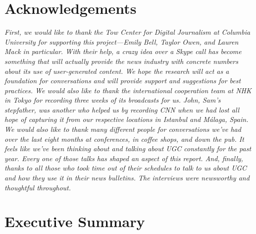 \chapter{Acknowledgements}
\textit{First, we would like to thank the Tow Center for Digital Journalism at Columbia University for supporting this project—Emily Bell, Taylor Owen, and Lauren Mack in particular. With their help, a crazy idea over a Skype call has become something that will actually provide the news industry with concrete numbers about its use of user-generated content. We hope the research will act as a foundation for conversations and will provide support and suggestions for best practices. We would also like to thank the international cooperation team at NHK in Tokyo for recording three weeks of its broadcasts for us. John, Sam's stepfather, was another who helped us by recording CNN when we had lost all hope of capturing it from our respective locations in Istanbul and Málaga, Spain. We would also like to thank many different people for conversations we've had over the last eight months at conferences, in coffee shops, and down the pub. It feels like we've been thinking about and talking about UGC constantly for the past year. Every one of those talks has shaped an aspect of this report. And, finally, thanks to all those who took time out of their schedules to talk to us about UGC and how they use it in their news bulletins. The interviews were newsworthy and thoughtful throughout.}

\chapter{Executive Summary}
